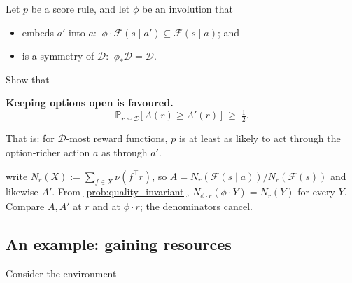 \documentclass[11pt]{article}
\newcommand{\Prob}{\mathbb{P}}
\newcommand{\Dist}{\mathcal{D}}    %
\newcommand{\F}{\mathcal{F}}       %
\begin{document}
\begin{exercise}
\label{prob:power_seeking} Let $p$ be a score rule, and let $\phi$ be an
involution that
\begin{itemize}\itemsep=2pt
  \item[(E)] embeds $a'$ into $a$: $\ \phi\cdot\F(s\mid a') \subseteq \F(s\mid a)$; and
  \item[(D)] is a symmetry of $\Dist$: $\ \phi_*\Dist = \Dist$.
\end{itemize}
Show that

\begin{callout}
\textbf{Keeping options open is favoured.}
$$
\Prob_{r\sim\Dist}\bigl[\, A(r) \ge A'(r) \,\bigr] \;\ge\; \tfrac{1}{2}.
$$
\end{callout}

\noindent That is: for $\Dist$-most reward functions, $p$ is at least as likely to act through the
option-richer action $a$ as through $a'$.
\end{exercise}
\begin{hint}
write $N_r(X) := \sum_{f\in X}\nu(f^\top r)$, so $A = N_r(\F(s\mid a))/N_r(\F(s))$ and
likewise $A'$. From \cref{prob:quality_invariant}, $N_{\phi\cdot r}(\phi\cdot Y) = N_r(Y)$ for every
$Y$. Compare $A, A'$ at $r$ and at $\phi\cdot r$; the denominators cancel.
\end{hint}


\subsection*{An example: gaining resources}

Consider the environment

\begin{center}
\end{center}
\end{document}
